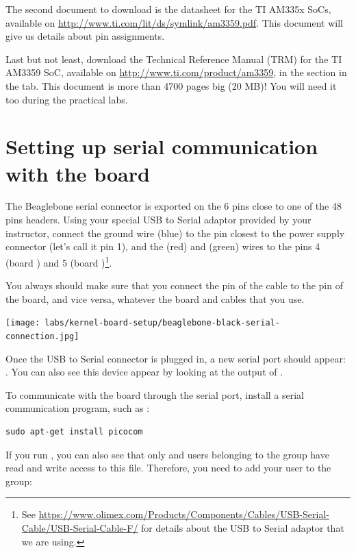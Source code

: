 The second document to download is the datasheet for the
TI AM335x SoCs, available on
\url{http://www.ti.com/lit/ds/symlink/am3359.pdf}. This document will
give us details about pin assignments.

Last but not least, download the Technical Reference Manual (TRM) for
the TI AM3359 SoC, available on \url{http://www.ti.com/product/am3359},
in the  section in the  tab.
This document is more than 4700 pages big (20 MB)! You will need it
too during the practical labs.

\section{Setting up serial communication with the board}

The Beaglebone serial connector is exported on the 6 pins close to one
of the 48 pins headers. Using your special USB to Serial adaptor provided
by your instructor, connect the ground wire (blue) to the pin closest
to the power supply connector (let's call it pin 1), and the  (red)
and  (green) wires to the pins 4 (board ) and
5 (board )\footnote{See
\url{https://www.olimex.com/Products/Components/Cables/USB-Serial-Cable/USB-Serial-Cable-F/}
for details about the USB to Serial adaptor that we are using.}.

You always should make sure that you connect the  pin of the cable
to the  pin of the board, and vice versa, whatever the board and
cables that you use.

\begin{center}
\texttt{[image: labs/kernel-board-setup/beaglebone-black-serial-connection.jpg]}
\end{center}

Once the USB to Serial connector is plugged in, a new serial port
should appear: .  You can also see this device
appear by looking at the output of .

To communicate with the board through the serial port, install a
serial communication program, such as :

\begin{verbatim}
sudo apt-get install picocom
\end{verbatim}

If you run , you can also see that only
 and users belonging to the  group have
read and write access to this file. Therefore, you need to add your user
to the  group:

